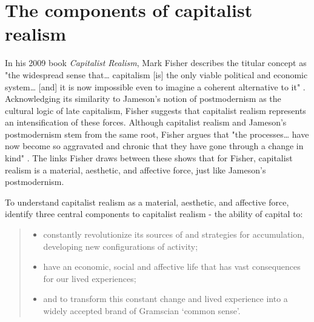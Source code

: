 \section{The components of capitalist realism}
\label{sec:2-components}

In his 2009 book \emph{Capitalist Realism}, Mark Fisher describes the titular concept as "the widespread sense that\ldots{} capitalism [is] the only viable political and economic system\ldots{} [and] it is now impossible even to imagine a coherent alternative to it" \citep[p. 2]{fisher_capitalist_2009}. Acknowledging its similarity to Jameson's \citeyearpar{jameson_postmodernism_1991} notion of postmodernism as the cultural logic of late capitalism, Fisher suggests that capitalist realism represents an intensification of these forces. Although capitalist realism and Jameson's postmodernism stem from the same root, Fisher argues that "the processes\ldots{} have now become so aggravated and chronic that they have gone through a change in kind" \cite[p. 7]{fisher_capitalist_2009}. The links Fisher draws between these shows that for Fisher, capitalist realism is a material, aesthetic, and affective force, just like Jameson's postmodernism. 

To understand capitalist realism as a material, aesthetic, and affective force, \citet[p. 6]{shonkwiler_reading_2014} identify three central components to capitalist realism - the ability of capital to:
\begin{quote}
\begin{itemize}
\item  constantly revolutionize its sources of and strategies for accumulation, developing new configurations of activity;
\item   have an economic, social and affective life that has vast consequences for our lived experiences;
\item  and to transform this constant change and lived experience into a widely accepted brand of Gramscian `common sense'.
\end{itemize}
\end{quote}

